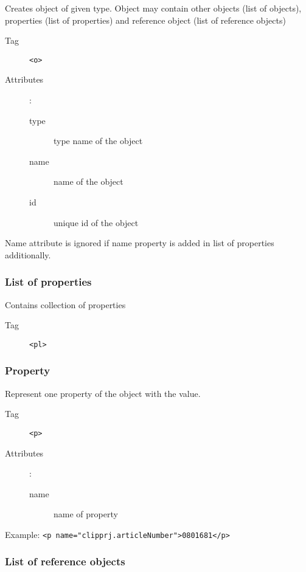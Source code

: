 \documentclass[%
	a4paper,
	oneside,
	listof=numbered,
	parskip=half,
	headsepline=true,
	footsepline=true,
	]{scrbook}
\begin{document}
Creates object of given type. Object may contain other objects (list of objects), properties (list of properties) and reference object (list of reference objects)

\begin{description}
	\item[Tag] \verb|<o>|
	\item[Attributes]:
	
	\begin{description}
		\item[type] type name of the object
		\item[name] name of the object
		\item[id] unique id of the object
	\end{description}
\end{description}

Name attribute is ignored if name property is added in list of properties additionally.

\subsubsection{List of properties}

Contains collection of properties

\begin{description}
	\item[Tag] \verb|<pl>|
\end{description}

\subsubsection{Property}

Represent one property of the object with the value.

\begin{description}
	\item[Tag] \verb|<p>|
	\item[Attributes]:
	
	\begin{description}
		\item[name] name of property
	\end{description}
\end{description}

Example: \verb|<p name="clipprj.articleNumber">0801681</p>|

\subsubsection{List of reference objects}
\end{document}
